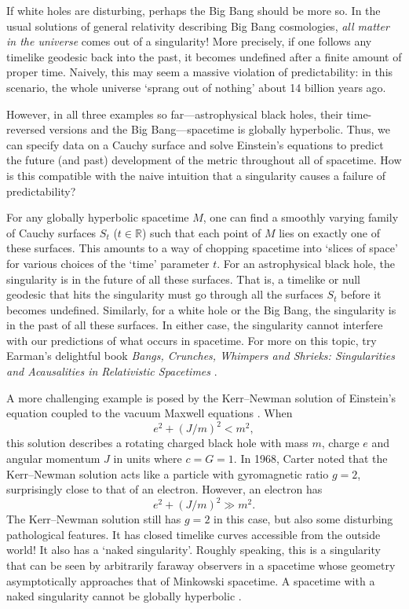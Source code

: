 \documentclass{article}
\newcommand{\R}{\mathbb{R}}
\begin{document}
If white holes are disturbing, perhaps the Big Bang should be more so.  In the usual solutions of general relativity describing Big Bang cosmologies, \emph{all matter in the universe} comes out of a singularity!  More precisely, if one follows any timelike geodesic back into the past, it becomes undefined after a finite amount of proper time.  Naively, this may seem a massive violation of predictability: in this scenario, the whole universe `sprang out of nothing' about 14 billion years ago. 

However, in all three examples so far---astrophysical black holes, their time-reversed versions and the Big Bang---spacetime is globally hyperbolic.  Thus, we can specify data on a Cauchy surface and solve Einstein's equations to predict the future (and past) development of the metric throughout all of spacetime.   How is this compatible with the naive intuition that a singularity causes a failure of predictability?   

For any globally hyperbolic spacetime $M$, one can find a smoothly varying family of Cauchy surfaces $S_t$ ($t \in \R$) such that each point of $M$ lies on exactly one of these surfaces.  This amounts to a way of chopping spacetime into `slices of space' for various choices of the `time' parameter $t$.  For an astrophysical black hole, the singularity is in the future of all these surfaces.   That is, a timelike or null geodesic that hits the singularity must go through all the surfaces $S_t$ before it becomes undefined.  Similarly, for a white hole or the Big Bang, the singularity is in the past of all these surfaces.  In either case, the singularity cannot interfere with our predictions of what occurs in spacetime.  For more on this topic, try Earman's delightful book \textsl{Bangs, Crunches, Whimpers and Shrieks: Singularities and Acausalities in Relativistic Spacetimes} \cite{Earman}.

A more challenging example is posed by the Kerr--Newman solution of Einstein's equation
coupled to the vacuum Maxwell equations \cite{Wald1984}.     When 
\[         e^2 + (J/m)^2 < m^2 ,\]
this solution describes a rotating charged black hole with mass $m$, charge $e$ and angular momentum $J$ in units where $c = G = 1$.    In 1968, 
Carter \cite{Carter1968} noted that the Kerr--Newman solution acts like a particle with gyromagnetic ratio $g = 2$, surprisingly close to that of an electron.  However, an electron has
\[         e^2 + (J/m)^2 \gg m^2 .\]
The Kerr--Newman solution still has $g = 2$ in this case, but also some
disturbing pathological features.   It has closed timelike curves accessible from
the outside world!  It also has a `naked singularity'.  Roughly speaking, this is a singularity that can be seen by arbitrarily faraway observers in a spacetime whose geometry asymptotically approaches that of Minkowski spacetime.  A spacetime with a naked singularity cannot be globally hyperbolic \cite{HawkingEllis}.    
\end{document}
